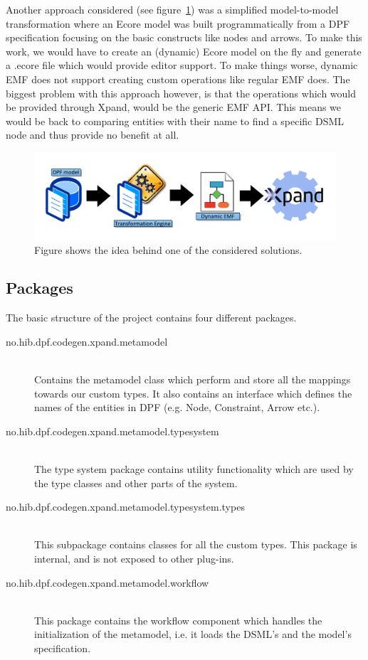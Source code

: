 Another approach considered (see figure~\ref{fig:xpand_dpf_m2m}) was a simplified model-to-model transformation where an Ecore model was built programmatically from a DPF specification focusing on the basic constructs like nodes and arrows. To make this work, we would have to create an (dynamic) Ecore model on the fly and generate a .ecore file which would provide editor support. To make things worse, dynamic EMF does not support creating custom operations like regular EMF does. The biggest problem with this approach however, is that the operations which would be provided through Xpand, would be the generic EMF API. This means we would be back to comparing  entities with their name to find a specific DSML node and thus provide no benefit at all.

\begin{figure}[htpb]
  \centering
  \centerline{\includegraphics[scale=0.8]{images/dpf_to_emf.pdf}}
  \caption[Model-to-model tranformation from DPF to EMF]{Figure shows the idea behind one of the considered solutions.}
  \label{fig:xpand_dpf_m2m}
\end{figure}


\subsection{Packages}
The basic structure of the  project contains four different packages.
\begin{description}
  \item[no.hib.dpf.codegen.xpand.metamodel] \hfill \\
  Contains the metamodel class which perform and store all the mappings towards our custom types. It also contains an interface which defines the names of the entities in DPF (e.g. Node, Constraint, Arrow etc.).
  \item[no.hib.dpf.codegen.xpand.metamodel.typesystem] \hfill \\
  The type system package contains utility functionality which are used by the type classes and other parts of the system.
  \item[no.hib.dpf.codegen.xpand.metamodel.typesystem.types] \hfill \\
  This subpackage contains classes for all the custom types. This package is internal, and is not exposed to other plug-ins.
  \item[no.hib.dpf.codegen.xpand.metamodel.workflow] \hfill \\
  This package contains the workflow component  which handles the initialization of the metamodel, i.e. it loads the DSML's and the model's specification.
\end{description}

